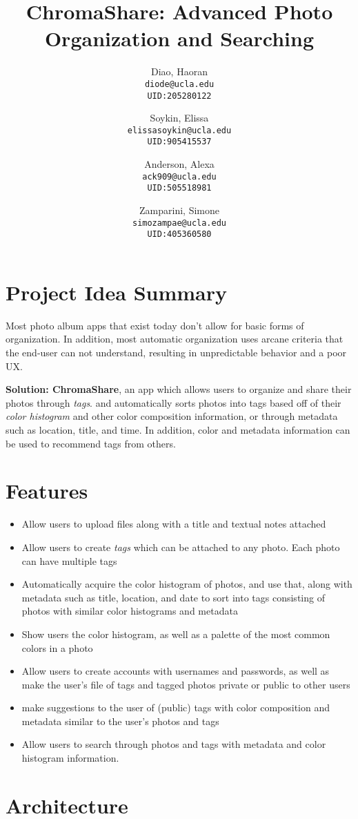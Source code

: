 \documentclass{article}
\title{ChromaShare: Advanced Photo Organization and Searching}
\author {
	Diao, Haoran\\ \texttt{diode@ucla.edu}\\ \texttt{UID:205280122}
	\and
	Soykin, Elissa\\ \texttt{elissasoykin@ucla.edu}\\ \texttt{UID:905415537}
	\and
	Anderson, Alexa\\ \texttt{ack909@ucla.edu}\\ \texttt{UID:505518981}
	\and
	Zamparini, Simone\\ \texttt{simozampae@ucla.edu}\\ \texttt{UID:405360580}
}
\begin{document}
\maketitle
\section{Project Idea Summary}
	Most photo album apps that exist today don't allow for
	basic forms of organization. In addition, most automatic
	organization uses arcane criteria that the end-user can not understand,
	resulting in unpredictable behavior and a poor UX.

	\textbf{Solution: ChromaShare}, an app which allows users to organize
	and share their photos through \textit{tags}. and automatically sorts
	photos into tags based off of their \textit{color histogram} and other color
	composition information, or through metadata such as location, title,
	and time. In addition, color and metadata information can be used to
	recommend tags from others.
\section{Features}

	\begin{itemize}
		\item Allow users to upload files along with a title and textual
		notes attached
		\item Allow users to create \textit{tags} which can be attached
		to any photo. Each photo can have multiple tags
		\item Automatically acquire the color histogram of photos, and
		use that, along with metadata such as title, location, and date
		to sort into tags consisting of photos with similar color
		histograms and metadata
		\item Show users the color histogram, as well as a palette of
		the most common colors in a photo
		\item Allow users to create accounts with usernames and
		passwords, as well as make the user's file of tags and tagged photos
		private or public to other users
		\item make suggestions to the user of (public) tags with color
		composition and metadata similar to the user's photos and tags
		\item Allow users to search through photos and tags with
		metadata and color histogram information.
	\end{itemize}

\section{Architecture}
\end{document}
